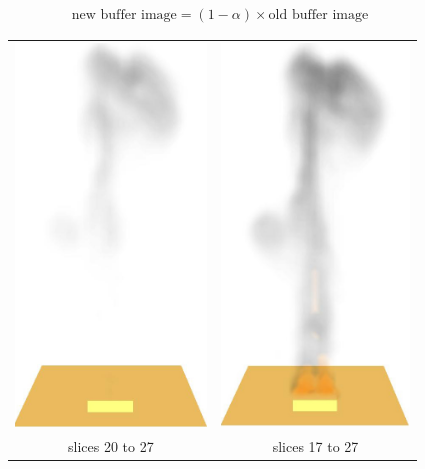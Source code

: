 \begin{eqnarray*}
\mbox{new buffer image} = (1-\alpha)\times \mbox{old buffer image}
\end{eqnarray*}


\begin{figure}[\figoptions]
\begin{center}
\begin{tabular}{cc}
\includegraphics[height=4.0in]{figures/splume_20_27}&
\includegraphics[height=4.0in]{figures/splume_17_27}\\
slices 20 to 27&slices 17 to 27\\

\end{tabular}
\end{center}
\end{figure}

